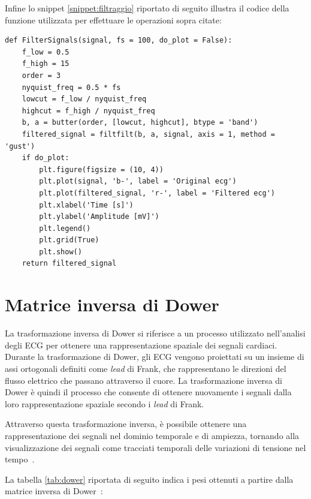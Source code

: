 Infine lo snippet \ref{snippet:filtraggio} riportato di seguito illustra il codice della funzione utilizzata per effettuare le operazioni sopra citate:

\lstset{language=Python}
\begin{lstlisting}[aboveskip=15pt, belowskip=15pt, basicstyle=\fontsize{8}{10}\selectfont, keywordstyle=\color{blue}, breaklines=true, label=snippet:filtraggio]
def FilterSignals(signal, fs = 100, do_plot = False):
    f_low = 0.5
    f_high = 15
    order = 3
    nyquist_freq = 0.5 * fs
    lowcut = f_low / nyquist_freq
    highcut = f_high / nyquist_freq
    b, a = butter(order, [lowcut, highcut], btype = 'band')
    filtered_signal = filtfilt(b, a, signal, axis = 1, method = 'gust')
    if do_plot:
        plt.figure(figsize = (10, 4))
        plt.plot(signal, 'b-', label = 'Original ecg')
        plt.plot(filtered_signal, 'r-', label = 'Filtered ecg')
        plt.xlabel('Time [s]')
        plt.ylabel('Amplitude [mV]')
        plt.legend()
        plt.grid(True)
        plt.show()
    return filtered_signal
\end{lstlisting}

\section{Matrice inversa di Dower}
\label{sec:matrice}

La trasformazione inversa di Dower si riferisce a un processo utilizzato nell'analisi degli ECG per ottenere una rappresentazione spaziale dei segnali cardiaci. Durante la trasformazione di Dower, gli ECG vengono proiettati su un insieme di assi ortogonali definiti come \textit{lead} di Frank, che rappresentano le direzioni del flusso elettrico che passano attraverso il cuore. La trasformazione inversa di Dower è quindi il processo che consente di ottenere nuovamente i segnali dalla loro rappresentazione spaziale secondo i \textit{lead} di Frank.

Attraverso questa trasformazione inversa, è possibile ottenere una rappresentazione dei segnali nel dominio temporale e di ampiezza, tornando alla visualizzazione dei segnali come tracciati temporali delle variazioni di tensione nel tempo~\cite{dower}.

La tabella \ref{tab:dower} riportata di seguito indica i pesi ottenuti a partire dalla matrice inversa di Dower~\cite{dowerecg}:

